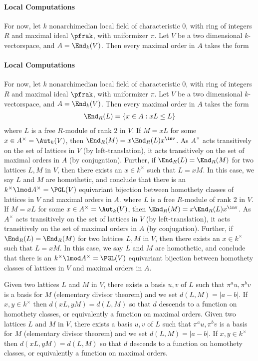 \documentclass[draft]{amsart}
\begin{document}
\paragraph*{Local Computations}
For now, let $k$ nonarchimedian local field of characteristic $0$, with ring of integers $R$ and maximal ideal $\pfrak$, with uniformizer $\pi$. Let $V$ be a two dimensional $k$-vectorspace, and $A = \End_k(V)$. Then every maximal order in $A$ takes the form
\paragraph*{Local Computations}
For now, let $k$ nonarchimedian local field of characteristic $0$, with ring of integers $R$ and maximal ideal $\pfrak$, with uniformizer $\pi$. Let $V$ be a two dimensional $k$-vectorspace, and $A = \End_k(V)$. Then every maximal order in $A$ takes the form
\begin{align*}
    \End_R(L) = \{ x \in A : xL\leq L\}
\end{align*}
where $L$ is a free $R$-module of rank $2$ in $V$. If $M = xL$ for some $x\in A^\times = \Aut_k(V)$, then $\End_R(M) = x\End_R(L)x^\inv$. As $A^\times$ acts transitively on the set of lattices in $V$ (by left-translation), it acts transitively on the set of maximal orders in $A$ (by conjugation). Further, if $\End_R(L)=\End_R(M)$ for two lattices $L,M$ in $V$, then there exists an $x \in k^\times$ such that $L = x M$. In this case, we say $L$ and $M$ are homothetic, and conclude that there is an $k^\times \lmod A^\times = \PGL(V)$ equivariant bijection between homothety classes of lattices in $V$ and maximal orders in $A$.
where $L$ is a free $R$-module of rank $2$ in $V$. If $M = xL$ for some $x\in A^\times = \Aut_k(V)$, then $\End_R(M) = x\End_R(L)x^\inv$. As $A^\times$ acts transitively on the set of lattices in $V$ (by left-translation), it acts transitively on the set of maximal orders in $A$ (by conjugation). Further, if $\End_R(L)=\End_R(M)$ for two lattices $L,M$ in $V$, then there exists an $x \in k^\times$ such that $L = x M$. In this case, we say $L$ and $M$ are homothetic, and conclude that there is an $k^\times \lmod A^\times = \PGL(V)$ equivariant bijection between homothety classes of lattices in $V$ and maximal orders in $A$.

Given two lattices $L$ and $M$ in $V$, there exists a basis $u,v$ of $L$ such that $\pi^a u , \pi^b v$ is a basis for $M$ (elementary divisor theorem) and we set $d(L,M) = |a-b|$. If $x,y\in k^\times$ then $d(xL,yM)=d(L,M)$ so that $d$ descends to a function on homothety classes, or equivalently a function on maximal orders.
Given two lattices $L$ and $M$ in $V$, there exists a basis $u,v$ of $L$ such that $\pi^a u , \pi^b v$ is a basis for $M$ (elementary divisor theorem) and we set $d(L,M) = |a-b|$. If $x,y\in k^\times$ then $d(xL,yM)=d(L,M)$ so that $d$ descends to a function on homothety classes, or equivalently a function on maximal orders.
\end{document}
